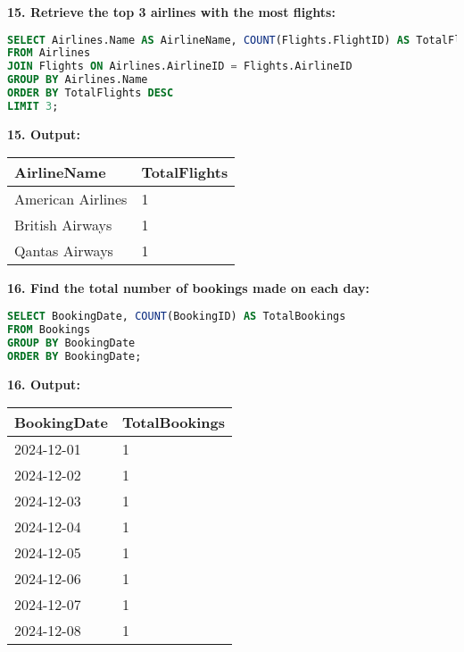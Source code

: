 \documentclass[14pt,a4paper]{extarticle}
\begin{document}
\newpage

    \textbf{15. Retrieve the top 3 airlines with the most flights:}
    \begin{lstlisting}[language=SQL, upquote=true]
SELECT Airlines.Name AS AirlineName, COUNT(Flights.FlightID) AS TotalFlights
FROM Airlines
JOIN Flights ON Airlines.AirlineID = Flights.AirlineID
GROUP BY Airlines.Name
ORDER BY TotalFlights DESC
LIMIT 3;
    \end{lstlisting}
    
    \textbf{15. Output:}
\begin{table}[h!]
\centering
\begin{tabular}{|l|l|}
\hline
\textbf{AirlineName}     & \textbf{TotalFlights} \\ \hline
American Airlines        & 1                     \\ \hline
British Airways          & 1                     \\ \hline
Qantas Airways           & 1                     \\ \hline
\end{tabular}
\end{table}

    \textbf{16. Find the total number of bookings made on each day:}
    \begin{lstlisting}[language=SQL, upquote=true]
SELECT BookingDate, COUNT(BookingID) AS TotalBookings
FROM Bookings
GROUP BY BookingDate
ORDER BY BookingDate;
    \end{lstlisting}
    
    \textbf{16. Output:}
\begin{table}[h!]
\centering
\begin{tabular}{|l|l|}
\hline
\textbf{BookingDate} & \textbf{TotalBookings} \\ \hline
2024-12-01           & 1                      \\ \hline
2024-12-02           & 1                      \\ \hline
2024-12-03           & 1                      \\ \hline
2024-12-04           & 1                      \\ \hline
2024-12-05           & 1                      \\ \hline
2024-12-06           & 1                      \\ \hline
2024-12-07           & 1                      \\ \hline
2024-12-08           & 1                      \\ \hline
\end{tabular}
\end{table}
\end{document}

